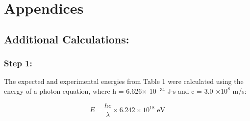 \documentclass[10pt, letterpaper, twoside]{article}
\begin{document}
\vfill\pagebreak

\appendix
\section{Appendices}

\subsection{Additional Calculations:}

\subsubsection{Step 1:}

The expected and experimental energies from Table 1 were calculated using the energy of a photon equation, where h = 6.626$\times$ 10$^{-34}$ J$\cdot$s and c = 3.0 $\times 10^{8}$ m/s:

\begin{equation*}
    E = \frac{hc}{\lambda} \times 6.242 \times 10^{18} \text{ eV}
\end{equation*}
\end{document}
